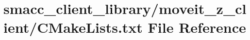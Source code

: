 \hypertarget{client__library_2moveit__z__client_2CMakeLists_8txt}{}\section{smacc\+\_\+client\+\_\+library/moveit\+\_\+z\+\_\+client/\+C\+Make\+Lists.txt File Reference}
\label{client__library_2moveit__z__client_2CMakeLists_8txt}

